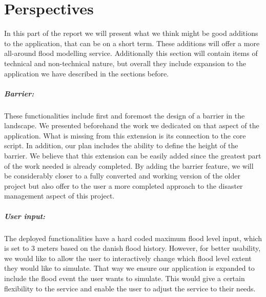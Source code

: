 
\chapter{Perspectives}


In this part of the report we will present what we think might be good additions to the application, that can be on a short term. These additions will offer a more all-around flood modelling service. Additionally this section will contain items of technical and non-technical nature, but overall they include expansion to the application we have described in the sections before.

\paragraph{Barrier:} These functionalities include first and foremost the design of a barrier in the landscape. We presented beforehand the work we dedicated on that aspect of the application. What is missing from this extension is its connection to the core script. In addition, our plan includes the ability to define the height of the barrier. We believe that this extension can be easily added since the greatest part of the work needed is already completed. By adding the barrier feature, we will be considerably closer to a fully converted and working version of the older project but also offer to the user a more completed approach to the disaster management aspect of this project.

\paragraph{User input:} The deployed functionalities have a hard coded  maximum flood level input, which is set to 3 meters based on the danish flood history. However, for better usability, we would like to allow the user to interactively change which flood level extent they would like to simulate. That way we ensure our application is expanded to include the flood event the user wants to simulate. This would give a certain flexibility to the service and enable the user to adjust the service to their needs. 

